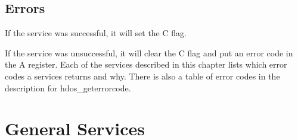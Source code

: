 \subsection{Errors}

If the service was successful, it will set the C flag.

If the service was unsuccessful, it will clear the C flag and put an error code
in the A register. Each of the services described in this chapter lists which
error codes a services returns and why. There is also a table of error codes in
the description for hdos\_geterrorcode.



\newpage
\section{General Services}


